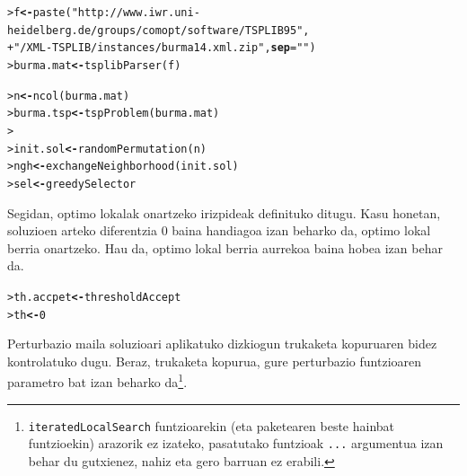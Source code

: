 \documentclass[eu]{ifirak}\usepackage[]{graphicx}\usepackage[]{color}
\makeatletter
\newcommand{\hlnum}[1]{\textcolor[rgb]{0.659,0.4,0.051}{#1}}%
\newcommand{\hlstr}[1]{\textcolor[rgb]{0.659,0.4,0.051}{#1}}%
\newcommand{\hlstd}[1]{\textcolor[rgb]{0,0,0}{#1}}%
\newcommand{\hlkwb}[1]{\textcolor[rgb]{0.549,0.114,0.412}{\textbf{#1}}}%
\newcommand{\hlkwc}[1]{\textcolor[rgb]{0.659,0.573,0.133}{\textbf{#1}}}%
\newcommand{\hlkwd}[1]{\textcolor[rgb]{0.659,0.133,0.482}{#1}}%
\newenvironment{kframe}{%
 \def\at@end@of@kframe{}%
 \ifinner\ifhmode%
  \def\at@end@of@kframe{\end{minipage}}%
  \begin{minipage}{\columnwidth}%
 \fi\fi%
 \def\FrameCommand##1{\hskip\@totalleftmargin \hskip-\fboxsep
 \colorbox{shadecolor}{##1}\hskip-\fboxsep
     \hskip-\linewidth \hskip-\@totalleftmargin \hskip\columnwidth}%
 \MakeFramed {\advance\hsize-\width
   \@totalleftmargin\z@ \linewidth\hsize
   \@setminipage}}%
 {\par\unskip\endMakeFramed%
 \at@end@of@kframe}
\newenvironment{knitrout}{}{} %
\newcommand{\code}[1]{\texttt{#1}}
\makeatother
\begin{document}
\begin{knitrout}
\color{fgcolor}\begin{kframe}
\begin{alltt}
\hlstd{> }\hlstd{f} \hlkwb{<-} \hlkwd{paste}\hlstd{(}\hlstr{"http://www.iwr.uni-heidelberg.de/groups/comopt/software/TSPLIB95"}\hlstd{,}
\hlstd{+ }           \hlstr{"/XML-TSPLIB/instances/burma14.xml.zip"}\hlstd{,} \hlkwc{sep}\hlstd{=}\hlstr{""}\hlstd{)}
\hlstd{> }\hlstd{burma.mat} \hlkwb{<-} \hlkwd{tsplibParser}\hlstd{(f)}
\end{alltt}


{\ttfamily\noindent\itshape\color{messagecolor}{\#\# Processing file corresponding to instance burma14: 14-Staedte in Burma (Zaw Win)}}\begin{alltt}
\hlstd{> }\hlstd{n} \hlkwb{<-} \hlkwd{ncol}\hlstd{(burma.mat)}
\hlstd{> }\hlstd{burma.tsp} \hlkwb{<-} \hlkwd{tspProblem}\hlstd{(burma.mat)}
\hlstd{> }
\hlstd{> }\hlstd{init.sol} \hlkwb{<-} \hlkwd{randomPermutation}\hlstd{(n)}
\hlstd{> }\hlstd{ngh}      \hlkwb{<-} \hlkwd{exchangeNeighborhood}\hlstd{(init.sol)}
\hlstd{> }\hlstd{sel}      \hlkwb{<-} \hlstd{greedySelector}
\end{alltt}
\end{kframe}
\end{knitrout}

Segidan, optimo lokalak onartzeko irizpideak definituko ditugu. Kasu honetan, soluzioen arteko diferentzia 0 baina handiagoa izan beharko da, optimo lokal berria onartzeko. Hau da,  optimo lokal berria aurrekoa baina hobea izan behar da.

\begin{knitrout}
\color{fgcolor}\begin{kframe}
\begin{alltt}
\hlstd{> }\hlstd{th.accpet} \hlkwb{<-} \hlstd{thresholdAccept}
\hlstd{> }\hlstd{th} \hlkwb{<-} \hlnum{0}
\end{alltt}
\end{kframe}
\end{knitrout}

Perturbazio maila soluzioari aplikatuko dizkiogun trukaketa kopuruaren bidez kontrolatuko dugu. Beraz, trukaketa kopurua, gure perturbazio funtzioaren parametro bat izan beharko da\footnote{\code{iteratedLocalSearch} funtzioarekin (eta paketearen beste hainbat funtzioekin) arazorik ez izateko, pasatutako funtzioak \code{...} argumentua izan behar du gutxienez, nahiz eta gero barruan ez erabili.}.
\end{document}

